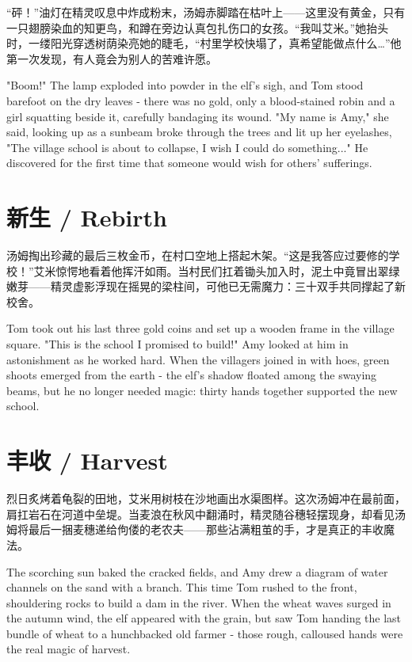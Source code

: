 “砰！”油灯在精灵叹息中炸成粉末，汤姆赤脚踏在枯叶上——这里没有黄金，只有一只翅膀染血的知更鸟，和蹲在旁边认真包扎伤口的女孩。“我叫艾米。”她抬头时，一缕阳光穿透树荫染亮她的睫毛，“村里学校快塌了，真希望能做点什么…”他第一次发现，有人竟会为别人的苦难许愿。

\begin{flushright}
    "Boom!" The lamp exploded into powder in the elf's sigh, and Tom stood barefoot on the dry leaves - there was no gold, only a blood-stained robin and a girl squatting beside it, carefully bandaging its wound. "My name is Amy," she said, looking up as a sunbeam broke through the trees and lit up her eyelashes, "The village school is about to collapse, I wish I could do something..." He discovered for the first time that someone would wish for others' sufferings.
\end{flushright}

\section*{新生 / Rebirth}

汤姆掏出珍藏的最后三枚金币，在村口空地上搭起木架。“这是我答应过要修的学校！”艾米惊愕地看着他挥汗如雨。当村民们扛着锄头加入时，泥土中竟冒出翠绿嫩芽——精灵虚影浮现在摇晃的梁柱间，可他已无需魔力：三十双手共同撑起了新校舍。

\begin{flushright}
    Tom took out his last three gold coins and set up a wooden frame in the village square. "This is the school I promised to build!" Amy looked at him in astonishment as he worked hard. When the villagers joined in with hoes, green shoots emerged from the earth - the elf's shadow floated among the swaying beams, but he no longer needed magic: thirty hands together supported the new school.
\end{flushright}

\section*{丰收 / Harvest}
烈日炙烤着龟裂的田地，艾米用树枝在沙地画出水渠图样。这次汤姆冲在最前面，肩扛岩石在河道中垒堤。当麦浪在秋风中翻涌时，精灵随谷穗轻摆现身，却看见汤姆将最后一捆麦穗递给佝偻的老农夫——那些沾满粗茧的手，才是真正的丰收魔法。

\begin{flushright}
    The scorching sun baked the cracked fields, and Amy drew a diagram of water channels on the sand with a branch. This time Tom rushed to the front, shouldering rocks to build a dam in the river. When the wheat waves surged in the autumn wind, the elf appeared with the grain, but saw Tom handing the last bundle of wheat to a hunchbacked old farmer - those rough, calloused hands were the real magic of harvest.
\end{flushright}

